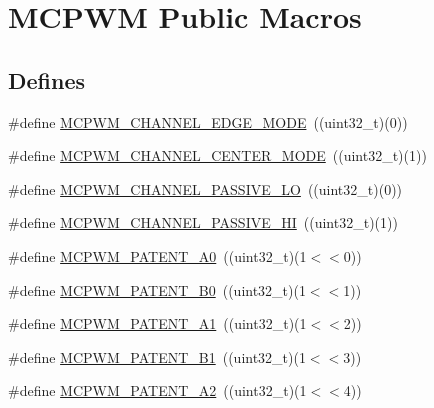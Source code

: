 \hypertarget{group___m_c_p_w_m___public___macros}{\section{\-M\-C\-P\-W\-M \-Public \-Macros}
\label{group___m_c_p_w_m___public___macros}
}
\subsection*{\-Defines}
\begin{DoxyCompactItemize}
\item 
\#define \hyperlink{group___m_c_p_w_m___public___macros_ga482fab06a9234743c6e1132e0c8b3f59}{\-M\-C\-P\-W\-M\-\_\-\-C\-H\-A\-N\-N\-E\-L\-\_\-\-E\-D\-G\-E\-\_\-\-M\-O\-D\-E}~((uint32\-\_\-t)(0))
\item 
\#define \hyperlink{group___m_c_p_w_m___public___macros_ga3101e708675b15c0fade244547225d14}{\-M\-C\-P\-W\-M\-\_\-\-C\-H\-A\-N\-N\-E\-L\-\_\-\-C\-E\-N\-T\-E\-R\-\_\-\-M\-O\-D\-E}~((uint32\-\_\-t)(1))
\item 
\#define \hyperlink{group___m_c_p_w_m___public___macros_gadaeec6a4828ba612ff3f95e375292b92}{\-M\-C\-P\-W\-M\-\_\-\-C\-H\-A\-N\-N\-E\-L\-\_\-\-P\-A\-S\-S\-I\-V\-E\-\_\-\-L\-O}~((uint32\-\_\-t)(0))
\item 
\#define \hyperlink{group___m_c_p_w_m___public___macros_gaa46bef9cb8614e7a5b5e499618afe7bc}{\-M\-C\-P\-W\-M\-\_\-\-C\-H\-A\-N\-N\-E\-L\-\_\-\-P\-A\-S\-S\-I\-V\-E\-\_\-\-H\-I}~((uint32\-\_\-t)(1))
\item 
\#define \hyperlink{group___m_c_p_w_m___public___macros_gac2a014461c52783ba46de0ae19d03700}{\-M\-C\-P\-W\-M\-\_\-\-P\-A\-T\-E\-N\-T\-\_\-\-A0}~((uint32\-\_\-t)(1$<$$<$0))
\item 
\#define \hyperlink{group___m_c_p_w_m___public___macros_ga7cba2e4bb6e650b8df3c46b8bf98b538}{\-M\-C\-P\-W\-M\-\_\-\-P\-A\-T\-E\-N\-T\-\_\-\-B0}~((uint32\-\_\-t)(1$<$$<$1))
\item 
\#define \hyperlink{group___m_c_p_w_m___public___macros_gac1a0fe63f0a4913bc3fca470b9189e03}{\-M\-C\-P\-W\-M\-\_\-\-P\-A\-T\-E\-N\-T\-\_\-\-A1}~((uint32\-\_\-t)(1$<$$<$2))
\item 
\#define \hyperlink{group___m_c_p_w_m___public___macros_ga6817389a404f96c227f61cd249e3659d}{\-M\-C\-P\-W\-M\-\_\-\-P\-A\-T\-E\-N\-T\-\_\-\-B1}~((uint32\-\_\-t)(1$<$$<$3))
\item 
\#define \hyperlink{group___m_c_p_w_m___public___macros_gaea7eea388b6f13ee499d9a4907b7f428}{\-M\-C\-P\-W\-M\-\_\-\-P\-A\-T\-E\-N\-T\-\_\-\-A2}~((uint32\-\_\-t)(1$<$$<$4))
$$
\end{DoxyCompactItemize}
